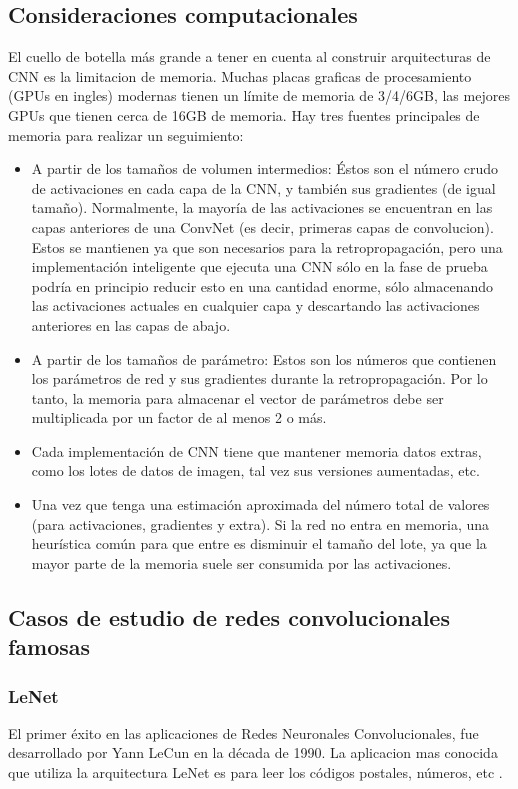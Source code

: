 \documentclass[a4paper,11pt,spanish]{book}
\begin{document}
    \subsection {Consideraciones computacionales}
      El cuello de botella más grande a tener en cuenta al construir arquitecturas de CNN es la limitacion de memoria.
      Muchas placas graficas de procesamiento (GPUs en ingles) modernas tienen un límite de memoria de 3/4/6GB, las mejores GPUs que tienen cerca de 16GB de memoria.
      Hay tres fuentes principales de memoria para realizar un seguimiento:
      \begin{itemize}
	\item A partir de los tamaños de volumen intermedios: Éstos son el número crudo de activaciones en cada capa de la CNN, y también sus gradientes (de igual tamaño). 
	  Normalmente, la mayoría de las activaciones se encuentran en las capas anteriores de una ConvNet (es decir, primeras capas de convolucion). 
	  Estos se mantienen ya que son necesarios para la retropropagación, pero una implementación inteligente que ejecuta una CNN sólo en la fase de prueba podría 
	  en principio reducir esto en una cantidad enorme, sólo almacenando las activaciones actuales en cualquier capa y descartando las activaciones anteriores 
	  en las capas de abajo.
	\item A partir de los tamaños de parámetro: Estos son los números que contienen los parámetros de red y sus gradientes durante la retropropagación. 
	  Por lo tanto, la memoria para almacenar el vector de parámetros debe ser multiplicada por un factor de al menos 2 o más.
	\item Cada implementación de CNN tiene que mantener memoria datos extras, como los lotes de datos de imagen, tal vez sus versiones aumentadas, etc.
	\item Una vez que tenga una estimación aproximada del número total de valores (para activaciones, gradientes y extra). Si la red no entra en memoria, una heurística común
	  para que entre es disminuir el tamaño del lote, ya que la mayor parte de la memoria suele ser consumida por las activaciones.
      \end{itemize}


    \subsection {Casos de estudio de redes convolucionales famosas}

      \subsubsection{LeNet}
	 El primer éxito en las aplicaciones de Redes Neuronales Convolucionales, fue desarrollado por Yann LeCun en la década de 1990. La aplicacion mas conocida que utiliza la arquitectura
	 LeNet es para leer los códigos postales, números, etc \cite{Lecun:LeNet}.
\end{document}

